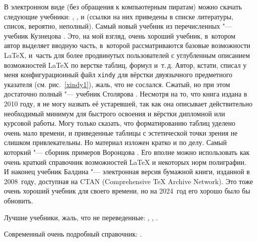 \documentclass[a4paper,12pt,hyphens]{article}
\newcommand\exe[1]{\texttt{#1}}
\begin{document}
В электронном виде (без обращения к компьютерным пиратам) можно скачать следующие учебники: \parencite{vorontsov:2005}, \parencite{baldin:2008}, \parencite{stolyarov:2010} и \parencite{kuznetsov:2021} (ссылки на них приведены в списке литературы, список, вероятно, неполный). Самый новый учебник из перечисленных "--- учебник Кузнецова \parencite{kuznetsov:2021}. Это, на мой взгляд, очень хороший учебник, в~котором автор выделяет вводную часть, в~которой рассматриваются базовые возможности \LaTeX, и~часть для более продвинутых пользователей с углубленным описанием возможностей \LaTeX{} по верстке таблиц, формул и~т.\,д. Автор, кстати, списал у меня конфигурационный файл \exe{xindy} для вёрстки двуязычного предметного указателя (см. рис.~\ref{xindy1}), жаль, что не сослался. Сжатый, но при этом достаточно полный "--- учебник Столярова \parencite{stolyarov:2010}. Несмотря на то, что книга издана в 2010 году, я не могу назвать её устаревшей, так как она описывает действительно необходимый минимум для быстрого освоения и вёрстки дипломной или курсовой работы. Могу только сказать, что форматированию таблиц уделено очень мало времени, и приведенные таблицы с эстетической точки зрения не слишком привлекательны. Но материал изложен кратко и по делу. Самый которкий "--- сборник примеров Воронцова \parencite{vorontsov:2005}. Его вполне можно использовать как очень краткий справочник возможностей \LaTeX{} и некоторых норм полиграфии. И наконец учебник Балдина \parencite{baldin:2008} "--- электронная версия бумажной книги, изданной в 2008~году, доступная на CTAN (Comprehensive \TeX{} Archive Network). Это тоже очень хороший учебник для своего времени, но на 2024~год его хорошо было бы обновить.

Лучшие учебники, жаль, что не переведенные: 
\parencite{lamport:1994},
\parencite{kopka-daly:2004},
\parencite{gratzer:2016}.

Современный очень подробный справочник:
\parencite{mittelbach-fischer:2023}.
\end{document}
